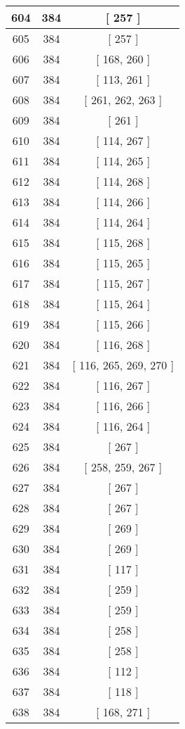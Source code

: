 \begin{center}
\begin{longtable}[H]{|| c c c ||}
\hline
604 & 384 & [ 257 ] \\ 
\hline
605 & 384 & [ 257 ] \\ 
\hline
606 & 384 & [ 168, 260 ] \\ 
\hline
607 & 384 & [ 113, 261 ] \\ 
\hline
608 & 384 & [ 261, 262, 263 ] \\ 
\hline
609 & 384 & [ 261 ] \\ 
\hline
610 & 384 & [ 114, 267 ] \\ 
\hline
611 & 384 & [ 114, 265 ] \\ 
\hline
612 & 384 & [ 114, 268 ] \\ 
\hline
613 & 384 & [ 114, 266 ] \\ 
\hline
614 & 384 & [ 114, 264 ] \\ 
\hline
615 & 384 & [ 115, 268 ] \\ 
\hline
616 & 384 & [ 115, 265 ] \\ 
\hline
617 & 384 & [ 115, 267 ] \\ 
\hline
618 & 384 & [ 115, 264 ] \\ 
\hline
619 & 384 & [ 115, 266 ] \\ 
\hline
620 & 384 & [ 116, 268 ] \\ 
\hline
621 & 384 & [ 116, 265, 269, 270 ] \\ 
\hline
622 & 384 & [ 116, 267 ] \\ 
\hline
623 & 384 & [ 116, 266 ] \\ 
\hline
624 & 384 & [ 116, 264 ] \\ 
\hline
625 & 384 & [ 267 ] \\ 
\hline
626 & 384 & [ 258, 259, 267 ] \\ 
\hline
627 & 384 & [ 267 ] \\ 
\hline
628 & 384 & [ 267 ] \\ 
\hline
629 & 384 & [ 269 ] \\ 
\hline
630 & 384 & [ 269 ] \\ 
\hline
631 & 384 & [ 117 ] \\ 
\hline
632 & 384 & [ 259 ] \\ 
\hline
633 & 384 & [ 259 ] \\ 
\hline
634 & 384 & [ 258 ] \\ 
\hline
635 & 384 & [ 258 ] \\ 
\hline
636 & 384 & [ 112 ] \\ 
\hline
637 & 384 & [ 118 ] \\ 
\hline
638 & 384 & [ 168, 271 ] \\ 

\end{longtable}
\end{center}
